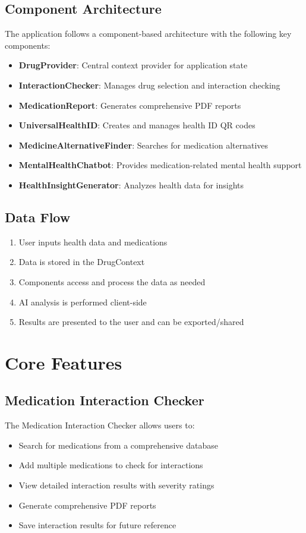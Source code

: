 \documentclass[12pt,a4paper]{report}
\begin{document}
\section{Component Architecture}
The application follows a component-based architecture with the following key components:
\begin{itemize}
    \item \textbf{DrugProvider}: Central context provider for application state
    \item \textbf{InteractionChecker}: Manages drug selection and interaction checking
    \item \textbf{MedicationReport}: Generates comprehensive PDF reports
    \item \textbf{UniversalHealthID}: Creates and manages health ID QR codes
    \item \textbf{MedicineAlternativeFinder}: Searches for medication alternatives
    \item \textbf{MentalHealthChatbot}: Provides medication-related mental health support
    \item \textbf{HealthInsightGenerator}: Analyzes health data for insights
\end{itemize}

\section{Data Flow}
\begin{enumerate}
    \item User inputs health data and medications
    \item Data is stored in the DrugContext
    \item Components access and process the data as needed
    \item AI analysis is performed client-side
    \item Results are presented to the user and can be exported/shared
\end{enumerate}

\chapter{Core Features}

\section{Medication Interaction Checker}
The Medication Interaction Checker allows users to:
\begin{itemize}
    \item Search for medications from a comprehensive database
    \item Add multiple medications to check for interactions
    \item View detailed interaction results with severity ratings
    \item Generate comprehensive PDF reports
    \item Save interaction results for future reference
\end{itemize}
\end{document}
